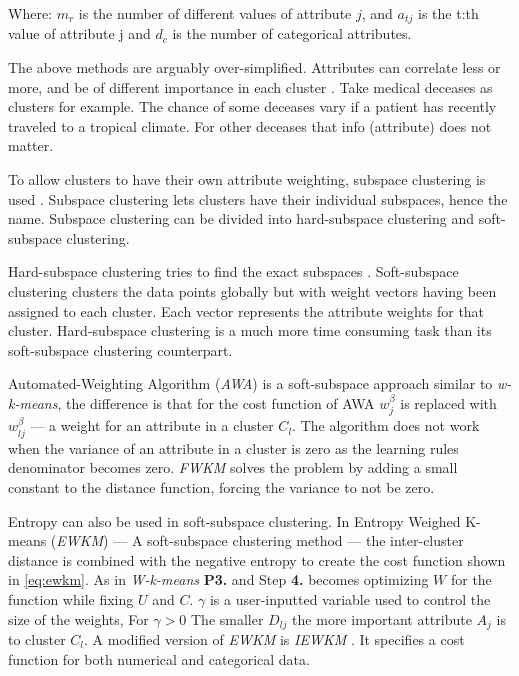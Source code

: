 \documentclass[../report.tex]{subfiles}
\begin{document}
Where:
${m_r}$ is the number of different values of attribute $j$, and $a_{tj}$ is the t:th value of attribute j and $d_c$ is the number of categorical attributes.

The above methods are arguably over-simplified. Attributes can correlate less or more, and be of different importance in each cluster . Take medical deceases as clusters for example. The chance of some deceases vary if a patient has recently traveled to a tropical climate. For other deceases that info (attribute) does not matter.

To allow clusters to have their own attribute weighting, subspace clustering is used \cite{Deng2016, Jing2007, Jia2018, Kriegler2012}. Subspace clustering lets clusters have their individual subspaces, hence the name. Subspace clustering can be divided into hard-subspace clustering and soft-subspace clustering.

Hard-subspace clustering tries to find the exact subspaces \cite{Kriegler2012, Jia2018, Jing2007,Deng2016}. Soft-subspace clustering clusters the data points globally but with weight vectors having been assigned to each cluster. Each vector represents the attribute weights for that cluster. Hard-subspace clustering is a much more time consuming task than its soft-subspace clustering counterpart.

Automated-Weighting Algorithm (\textit{AWA}) \cite{Chan2004} is a soft-subspace approach similar to \textit{w-k-means}, the difference is that for the cost function of AWA $w_j^\beta$ is replaced with $w_{ lj }^\beta$ --- a weight for an attribute in a cluster $C_l$. The algorithm does not work when the variance of an attribute in a cluster is zero as the learning rules denominator becomes zero. \textit{ FWKM } \cite{Jing2005} solves the problem by adding a small constant to the distance function, forcing the variance to not be zero.

Entropy can also be used in soft-subspace clustering. In Entropy Weighed K-means (\textit{EWKM}) \cite{Jing2007} --- A soft-subspace clustering method --- the inter-cluster distance is combined with the negative entropy to create the cost function shown in \ref{eq:ewkm}. As in \textit{W-k-means} \textbf{P3.} and Step \textbf{4.} becomes optimizing $W$ for the function while fixing $U$ and $C$. $\gamma$ is a user-inputted variable used to control the size of the weights, For $\gamma > 0$ The smaller $D_{ lj }$ the more important attribute $A_j$ is to cluster $C_l$. A modified version of \textit{EWKM} is \textit{IEWKM} \cite{Li2008}. It specifies a cost function for both numerical and categorical data.
\end{document}
